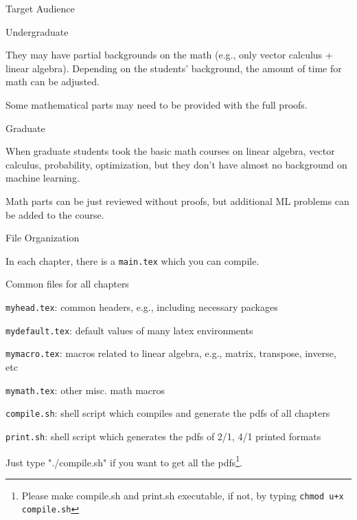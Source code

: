 \documentclass[handout,fleqn,aspectratio=169]{beamer}
\begin{document}
\begin{frame}{Target Audience}

\plitemsep 0.1in

\bci 

\item Undergraduate
\bci 
\item They may have partial backgrounds on the math (e.g., only vector calculus + linear algebra). Depending on the students' background, the amount of time for math can be adjusted. 

\item Some mathematical parts may need to be provided with the full proofs. 
\eci 

\item Graduate
\bci
\item When graduate students took the basic math courses on linear algebra, vector calculus, probability, optimization, but they don't have almost no background on machine learning.
\item Math parts can be just reviewed without proofs, but additional ML problems can be added to the course.
\eci
\eci
\end{frame}



\begin{frame}{File Organization}

\plitemsep 0.1in

\bci 

\item In each chapter, there is a {\tt main.tex} which you can compile.

\item Common files for all chapters
\bci
\item {\tt myhead.tex}: common headers, e.g., including necessary packages
\item {\tt mydefault.tex}: default values of many latex environments
\item {\tt mymacro.tex}: macros related to linear algebra, e.g., matrix, transpose, inverse, etc
\item {\tt mymath.tex}: other misc. math macros
\item {\tt compile.sh}: shell script which compiles and generate the pdfs of all chapters
\item {\tt print.sh}: shell script which generates the pdfs of 2/1, 4/1 printed formats
\eci

\item Just type "./compile.sh" if you want to get all the pdfs\footnote{Please make compile.sh and print.sh executable, if not, by typing {\tt chmod u+x compile.sh}}. 
\eci
\end{frame}
\end{document}
